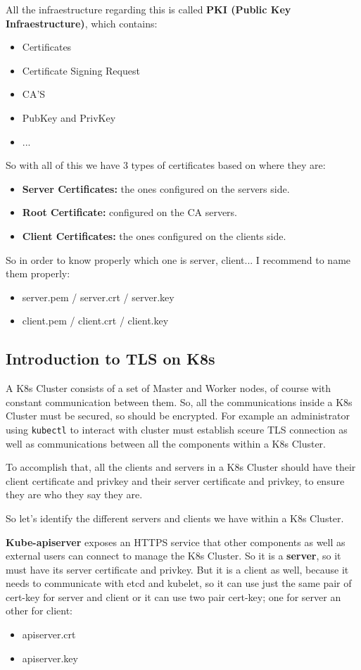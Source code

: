 \documentclass{article}
\begin{document}
All the infraestructure regarding this is called \textbf{PKI (Public Key Infraestructure)}, which contains:
\begin{itemize}
    \item Certificates
    \item Certificate Signing Request
    \item CA'S
    \item PubKey and PrivKey
    \item ...
\end{itemize}

So with all of this we have 3 types of certificates based on where they are:
\begin{itemize}
    \item \textbf{Server Certificates:} the ones configured on the servers side.
    \item \textbf{Root Certificate:} configured on the CA servers.
    \item \textbf{Client Certificates:} the ones configured on the clients side. 
\end{itemize}

So in order to know properly which one is server, client... I recommend to name them properly:
\begin{itemize}
    \item server.pem / server.crt / server.key 
    \item client.pem / client.crt / client.key
\end{itemize}
\subsection{Introduction to TLS on K8s}
A K8s Cluster consists of a set of Master and Worker nodes, of course with constant communication between them. So, all the communications inside a K8s Cluster must be secured, so should be encrypted.
For example an administrator using \verb|kubectl| to interact with cluster must establish sceure TLS connection as well as communications between all the components within a K8s Cluster.

To accomplish that, all the clients and servers in a K8s Cluster should have their client certificate and privkey and their server certificate and privkey, to ensure they are who they say they are.

So let's identify the different servers and clients we have within a K8s Cluster.

\textbf{Kube-apiserver} exposes an HTTPS service that other components as well as external users can connect to manage the K8s Cluster. So it is a \textbf{server}, so it must have its server certificate and privkey. But it is a client as well, because it 
needs to communicate with etcd and kubelet, so it can use just the same pair of cert-key for server and client or it can use two pair cert-key; one for server an other for client:
\begin{itemize}
    \item apiserver.crt
    \item apiserver.key
\end{itemize}
\end{document}
